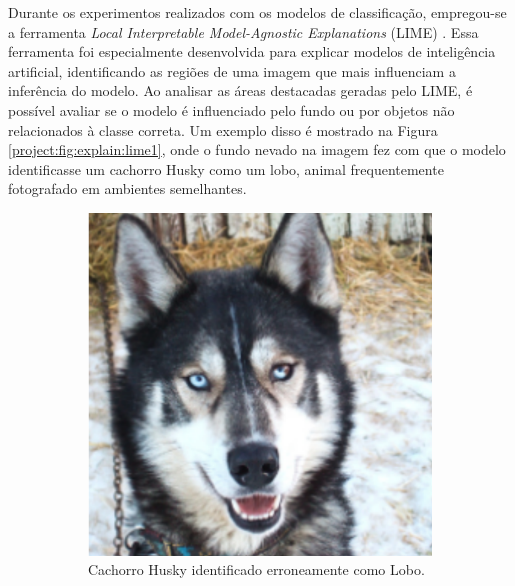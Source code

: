 Durante os experimentos realizados com os modelos de classificação, empregou-se a ferramenta \textit{Local Interpretable Model-Agnostic Explanations} (LIME) \citep{Ribeiro2016WhyClassifier}. Essa ferramenta foi especialmente desenvolvida para explicar modelos de inteligência artificial, identificando as regiões de uma imagem que mais influenciam a inferência do modelo. Ao analisar as áreas destacadas geradas pelo LIME, é possível avaliar se o modelo é influenciado pelo fundo ou por objetos não relacionados à classe correta. Um exemplo disso é mostrado na Figura \ref{project:fig:explain:lime1}, onde o fundo nevado na imagem fez com que o modelo identificasse um cachorro Husky como um lobo, animal frequentemente fotografado em ambientes semelhantes.

\begin{figure}[H]
    \centering
    \caption{Exemplo de saída gerado pelo LIME em situação de erro.}
    \label{project:fig:explain:lime1}
    \begin{subfigure}[t]{0.5\textwidth}
        \centering
        \includegraphics[width=1\linewidth]{recursos/imagens/project/husky.png}
        \caption{Cachorro Husky identificado erroneamente como Lobo.}
        \label{project:fig:explain:lime1.1}
    \end{subfigure}%
    ~
    \begin{subfigure}[t]{0.5\textwidth}

\end{subfigure}
\end{figure}
